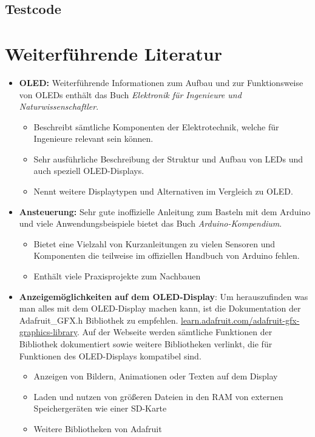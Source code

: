 \subsection{Testcode}
{
	\label{Code:Test:File:TestOLEDDisplay}
}


\section{Weiterführende Literatur}

\begin{itemize}
	\item 	\textbf{OLED:}
	Weiterführende Informationen zum Aufbau und zur Funktionsweise von OLEDs enthält das Buch 
	\glqq \textit{Elektronik für Ingenieure und Naturwissenschaftler}\grqq \cite{Hering.2021}. 
	
\begin{itemize}
	\item Beschreibt sämtliche Komponenten der Elektrotechnik, welche für Ingenieure relevant sein können.
	\item Sehr ausführliche Beschreibung der Struktur und Aufbau von LEDs und auch speziell OLED-Displays.
	\item Nennt weitere Displaytypen und Alternativen im Vergleich zu OLED.
\end{itemize}
	
	\item 	\textbf{Ansteuerung:} Sehr gute inoffizielle Anleitung zum Basteln mit dem Arduino und viele Anwendungsbeispiele bietet das Buch 	
	\glqq \textit{Arduino-Kompendium}\grqq \cite{Schreiter.2019}. 
	
	\begin{itemize}
		\item Bietet eine Vielzahl von Kurzanleitungen zu vielen Sensoren und Komponenten die teilweise im offiziellen Handbuch von Arduino fehlen.
		\item Enthält viele Praxisprojekte zum Nachbauen
	\end{itemize}
		
	
	\item \textbf{Anzeigemöglichkeiten auf dem OLED-Display}: Um herauszufinden was man alles mit dem OLED-Display machen kann, ist die Dokumentation der Adafruit\_GFX.h Bibliothek zu empfehlen. \href{https://learn.adafruit.com/adafruit-gfx-graphics-library}{learn.adafruit.com/adafruit-gfx-graphics-library}. 
	Auf der Webseite werden sämtliche Funktionen der Bibliothek dokumentiert sowie weitere Bibliotheken verlinkt, die für Funktionen des OLED-Displays kompatibel sind.
	\begin{itemize}
		\item Anzeigen von Bildern, Animationen oder Texten auf dem Display
		\item Laden und nutzen von größeren Dateien in den RAM von externen Speichergeräten wie einer SD-Karte
		\item Weitere Bibliotheken von Adafruit 
	\end{itemize}

\end{itemize}




